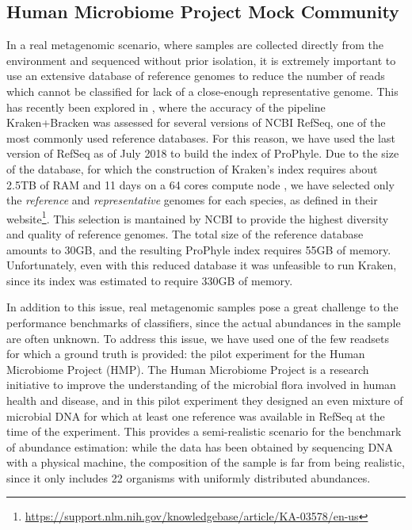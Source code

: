 \subsection{Human Microbiome Project Mock Community}
\label{hmp_exp}

In a real metagenomic scenario, where samples are collected directly from the environment and sequenced without prior isolation, it is extremely important to use an extensive database of reference genomes to reduce the number of reads which cannot be classified for lack of a close-enough representative genome. This has recently been explored in \cite{nasko_refseq_2018}, where the accuracy of the pipeline Kraken+Bracken was assessed for several versions of NCBI RefSeq, one of the most commonly used reference databases. For this reason, we have used the last version of RefSeq as of July 2018 to build the index of ProPhyle. Due to the size of the database, for which the construction of Kraken's index requires about 2.5TB of RAM and 11 days on a 64 cores compute node \cite{nasko_refseq_2018}, we have selected only the \textit{reference} and \textit{representative} genomes for each species, as defined in their website\footnote{\url{https://support.nlm.nih.gov/knowledgebase/article/KA-03578/en-us}}. This selection is mantained by NCBI to provide the highest diversity and quality of reference genomes. The total size of the reference database amounts to 30GB, and the resulting ProPhyle index requires 55GB of memory. Unfortunately, even with this reduced database it was unfeasible to run Kraken, since its index was estimated to require 330GB of memory.

In addition to this issue, real metagenomic samples pose a great challenge to the performance benchmarks of classifiers, since the actual abundances in the sample are often unknown. To address this issue, we have used one of the few readsets for which a ground truth is provided: the pilot experiment for the Human Microbiome Project (HMP). The Human Microbiome Project is a research initiative to improve the understanding of the microbial flora involved in human health and disease, and in this pilot experiment they designed an even mixture of microbial DNA for which at least one reference was available in RefSeq at the time of the experiment. This provides a semi-realistic scenario for the benchmark of abundance estimation: while the data has been obtained by sequencing DNA with a physical machine, the composition of the sample is far from being realistic, since it only includes 22 organisms with uniformly distributed abundances.

